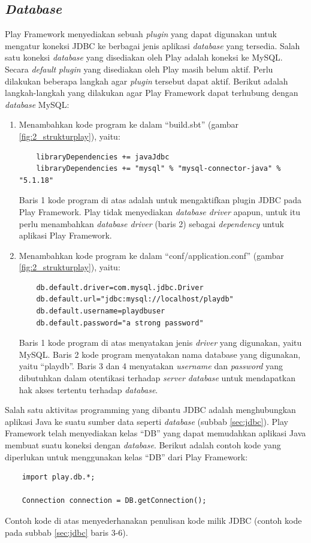 \subsection{\textit{Database}}
\label{sec:database}
Play Framework menyediakan sebuah \textit{plugin} yang dapat digunakan untuk mengatur koneksi JDBC ke berbagai jenis aplikasi \textit{database} yang tersedia\cite{playframeworkweb}. Salah satu koneksi \textit{database} yang disediakan oleh Play adalah koneksi ke MySQL. Secara \textit{default} \textit{plugin} yang disediakan oleh Play masih belum aktif. Perlu dilakukan beberapa langkah agar \textit{plugin} tersebut dapat aktif. Berikut adalah langkah-langkah yang dilakukan agar Play Framework dapat terhubung dengan \textit{database} MySQL:
\begin{enumerate}
	\item Menambahkan kode program ke dalam ``build.sbt'' (gambar \ref{fig:2_strukturplay}), yaitu:
	
	\begin{lstlisting}
	libraryDependencies += javaJdbc
	libraryDependencies += "mysql" % "mysql-connector-java" % "5.1.18"
	\end{lstlisting}
	
	Baris 1 kode program di atas adalah untuk mengaktifkan plugin JDBC pada Play Framework. Play tidak menyediakan \textit{database driver} apapun, untuk itu perlu menambahkan \textit{database driver} (baris 2) sebagai \textit{dependency} untuk aplikasi Play Framework.
	
	\item Menambahkan kode program ke dalam ``conf/application.conf'' (gambar \ref{fig:2_strukturplay}), yaitu:
	
	\begin{lstlisting}
	db.default.driver=com.mysql.jdbc.Driver
	db.default.url="jdbc:mysql://localhost/playdb"
	db.default.username=playdbuser
	db.default.password="a strong password"
	\end{lstlisting}
	
	Baris 1 kode program di atas menyatakan jenis \textit{driver} yang digunakan, yaitu MySQL. Baris 2 kode program menyatakan nama database yang digunakan, yaitu ``playdb''. Baris 3 dan 4 menyatakan \textit{username} dan \textit{password} yang dibutuhkan dalam otentikasi terhadap \textit{server database} untuk mendapatkan hak akses tertentu terhadap \textit{database}.
\end{enumerate}

	Salah satu aktivitas programming yang dibantu JDBC adalah menghubungkan aplikasi Java ke suatu sumber data seperti \textit{database} (subbab \ref{sec:jdbc}). Play Framework telah menyediakan kelas ``DB'' yang dapat memudahkan aplikasi Java membuat suatu koneksi dengan \textit{database}. Berikut adalah contoh kode yang diperlukan untuk menggunakan kelas ``DB'' dari Play Framework:
	\begin{lstlisting}
	import play.db.*;

	Connection connection = DB.getConnection();
	\end{lstlisting}
	Contoh kode di atas menyederhanakan penulisan kode milik JDBC (contoh kode pada subbab \ref{sec:jdbc} baris 3-6). 